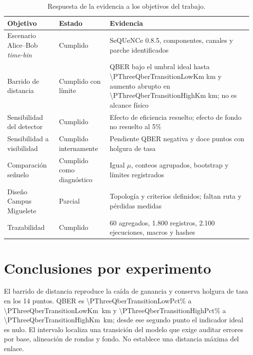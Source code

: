 \begin{table}[htbp]
  \centering
  \small
  \begin{tabularx}{\textwidth}{p{}p{}X}
    \toprule
    Objetivo & Estado & Evidencia \\
    \midrule
    Escenario Alice--Bob \textit{time-bin} & Cumplido & SeQUeNCe 0.8.5, componentes, canales y parche identificados \\
    Barrido de distancia & Cumplido con límite & QBER bajo el umbral ideal hasta \num[round-mode=places,round-precision=2]{\PThreeQberTransitionLowKm} km y aumento abrupto en \num[round-mode=places,round-precision=2]{\PThreeQberTransitionHighKm} km; no es alcance físico \\
    Sensibilidad del detector & Cumplido & Efecto de eficiencia resuelto; efecto de fondo no resuelto al 5\% \\
    Sensibilidad a visibilidad & Cumplido internamente & Pendiente QBER negativa y doce puntos con holgura de tasa \\
    Comparación señuelo & Cumplido como diagnóstico & Igual \(\mu\), conteos agrupados, bootstrap y límites registrados \\
    Diseño Campus Miguelete & Parcial & Topología y criterios definidos; faltan ruta y pérdidas medidas \\
    Trazabilidad & Cumplido & 60 agregados, 1.800 registros, 2.100 ejecuciones, macros y hashes \\
    \bottomrule
  \end{tabularx}
  \caption{Respuesta de la evidencia a los objetivos del trabajo.}
  \label{tab:objetivos_cierre}
\end{table}

\section{Conclusiones por experimento}

El barrido de distancia reproduce la caída de ganancia y conserva holgura de tasa en los 14 puntos. QBER es \num[round-mode=places,round-precision=3]{\PThreeQberTransitionLowPct}\% a \SI[round-mode=places,round-precision=2]{\PThreeQberTransitionLowKm}{\kilo\meter} y \num[round-mode=places,round-precision=3]{\PThreeQberTransitionHighPct}\% a \SI[round-mode=places,round-precision=2]{\PThreeQberTransitionHighKm}{\kilo\meter}; desde ese segundo punto el indicador ideal es nulo. El intervalo localiza una transición del modelo que exige auditar errores por base, alineación de rondas y fondo. No establece una distancia máxima del enlace.

